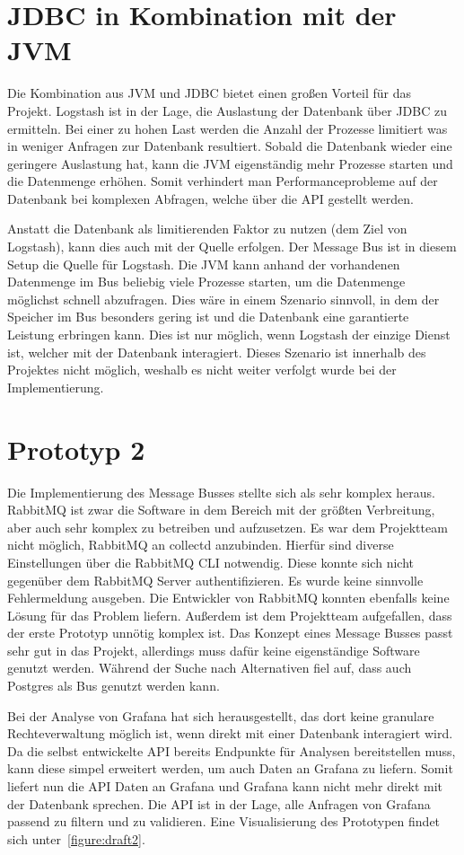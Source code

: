 \section{JDBC in Kombination mit der JVM}
Die Kombination aus JVM und JDBC bietet einen großen Vorteil für das Projekt.
Logstash ist in der Lage, die Auslastung der Datenbank über JDBC zu ermitteln.
Bei einer zu hohen Last werden die Anzahl der Prozesse limitiert was in weniger
Anfragen zur Datenbank resultiert. Sobald die Datenbank wieder eine geringere
Auslastung hat, kann die JVM eigenständig mehr Prozesse starten und die
Datenmenge erhöhen. Somit verhindert man Performanceprobleme auf der Datenbank
bei komplexen Abfragen, welche über die API gestellt werden.

Anstatt die Datenbank als limitierenden Faktor zu nutzen (dem Ziel von
Logstash), kann dies auch mit der Quelle erfolgen. Der Message Bus ist
in diesem Setup die Quelle für Logstash. Die JVM kann anhand der vorhandenen
Datenmenge im Bus beliebig viele Prozesse starten, um die Datenmenge möglichst
schnell abzufragen. Dies wäre in einem Szenario sinnvoll, in dem der Speicher
im Bus besonders gering ist und die Datenbank eine garantierte Leistung
erbringen kann. Dies ist nur möglich, wenn Logstash der einzige Dienst ist,
welcher mit der Datenbank interagiert. Dieses Szenario ist innerhalb des
Projektes nicht möglich, weshalb es nicht weiter verfolgt wurde bei der
Implementierung.
\tm%


\section{Prototyp 2}
Die Implementierung des Message Busses stellte sich als sehr komplex heraus.
RabbitMQ ist zwar die Software in dem Bereich mit der größten Verbreitung, aber
auch sehr komplex zu betreiben und aufzusetzen. Es war dem Projektteam nicht
möglich, RabbitMQ an collectd anzubinden. Hierfür sind diverse Einstellungen
über die RabbitMQ \gls{CLI} notwendig. Diese konnte sich nicht gegenüber dem
RabbitMQ Server authentifizieren. Es wurde keine sinnvolle Fehlermeldung
ausgeben. Die Entwickler von RabbitMQ konnten ebenfalls keine Lösung für das
Problem liefern. Außerdem ist dem Projektteam aufgefallen, dass der erste
Prototyp unnötig komplex ist. Das Konzept eines Message Busses passt sehr gut
in das Projekt, allerdings muss dafür keine eigenständige Software genutzt
werden. Während der Suche nach Alternativen fiel auf, dass auch Postgres als
Bus genutzt werden kann.

Bei der Analyse von Grafana hat sich herausgestellt, das dort keine granulare
Rechteverwaltung möglich ist, wenn direkt mit einer Datenbank interagiert wird.
Da die selbst entwickelte API bereits Endpunkte für Analysen bereitstellen
muss, kann diese simpel erweitert werden, um auch Daten an Grafana zu liefern.
Somit liefert nun die API Daten an Grafana und Grafana kann nicht mehr direkt
mit der Datenbank sprechen. Die API ist in der Lage, alle Anfragen von Grafana
passend zu filtern und zu validieren. Eine Visualisierung des Prototypen
findet sich unter~\ref{figure:draft2}.
\tm%

